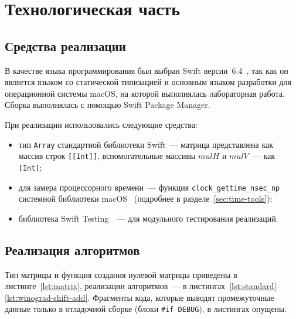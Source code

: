 \section{Технологическая часть}

\subsection{Средства реализации}
В качестве языка программирования был выбран Swift версии~6.4~\cite{swift-book}, так как он является языком со статической типизацией и основным языком разработки для операционной системы macOS, на которой выполнялась лабораторная работа. Сборка выполнялась с помощью Swift Package Manager.

При реализации использовались следующие средства:
\begin{itemize}
	\item тип \texttt{Array} стандартной библиотеки Swift~--- матрица представлена как массив строк \texttt{[[Int]]}, вспомогательные массивы $mulH$ и $mulV$~--- как \texttt{[Int]};
	\item для замера процессорного времени~--- функция \texttt{clock\_gettime\_nsec\_np} системной библиотеки macOS~\cite{clock-gettime} (подробнее в разделе~\ref{sec:time-tools});
	\item библиотека Swift Testing~\cite{swift-testing}~--- для модульного тестирования реализаций.
\end{itemize}

\subsection{Реализация алгоритмов}
Тип матрицы и функция создания нулевой матрицы приведены в листинге~\ref{lst:matrix}, реализации алгоритмов~--- в листингах~\ref{lst:standard}--\ref{lst:winograd-shift-add}. Фрагменты кода, которые выводят промежуточные данные только в отладочной сборке (блоки \texttt{\#if DEBUG}), в листингах опущены.













